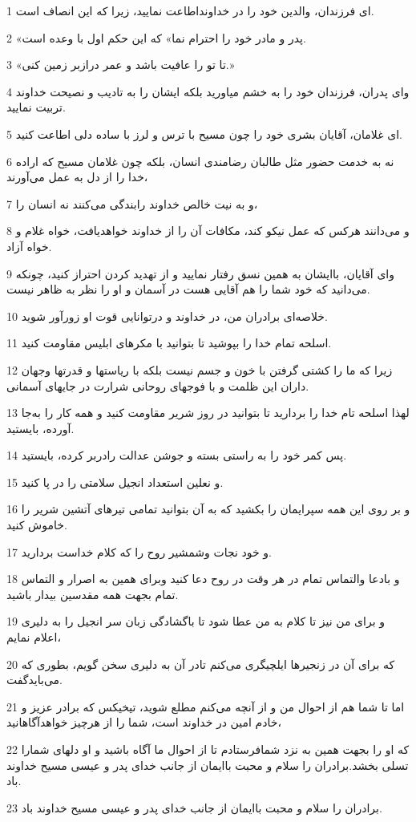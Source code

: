 \par 1 ای فرزندان، والدین خود را در خداونداطاعت نمایید، زیرا که این انصاف است.
\par 2 «پدر و مادر خود را احترام نما» که این حکم اول با وعده است.
\par 3 «تا تو را عافیت باشد و عمر درازبر زمین کنی.»
\par 4 و‌ای پدران، فرزندان خود را به خشم میاورید بلکه ایشان را به تادیب و نصیحت خداوند تربیت نمایید.
\par 5 ‌ای غلامان، آقایان بشری خود را چون مسیح با ترس و لرز با ساده دلی اطاعت کنید.
\par 6 نه به خدمت حضور مثل طالبان رضامندی انسان، بلکه چون غلامان مسیح که اراده خدا را از دل به عمل می‌آورند،
\par 7 و به نیت خالص خداوند رابندگی می‌کنند نه انسان را،
\par 8 و می‌دانند هرکس که عمل نیکو کند، مکافات آن را از خداوند خواهدیافت، خواه غلام و خواه آزاد.
\par 9 و‌ای آقایان، باایشان به همین نسق رفتار نمایید و از تهدید کردن احتراز کنید، چونکه می‌دانید که خود شما را هم آقایی هست در آسمان و او را نظر به ظاهر نیست.
\par 10 خلاصه‌ای برادران من، در خداوند و درتوانایی قوت او زورآور شوید.
\par 11 اسلحه تمام خدا را بپوشید تا بتوانید با مکرهای ابلیس مقاومت کنید.
\par 12 زیرا که ما را کشتی گرفتن با خون و جسم نیست بلکه با ریاستها و قدرتها وجهان داران این ظلمت و با فوجهای روحانی شرارت در جایهای آسمانی.
\par 13 لهذا اسلحه تام خدا را بردارید تا بتوانید در روز شریر مقاومت کنید و همه کار را به‌جا آورده، بایستید.
\par 14 پس کمر خود را به راستی بسته و جوشن عدالت رادربر کرده، بایستید.
\par 15 و نعلین استعداد انجیل سلامتی را در پا کنید.
\par 16 و بر روی این همه سپرایمان را بکشید که به آن بتوانید تمامی تیرهای آتشین شریر را خاموش کنید.
\par 17 و خود نجات وشمشیر روح را که کلام خداست بردارید.
\par 18 و بادعا والتماس تمام در هر وقت در روح دعا کنید وبرای همین به اصرار و التماس تمام بجهت همه مقدسین بیدار باشید.
\par 19 و برای من نیز تا کلام به من عطا شود تا باگشادگی زبان سر انجیل را به دلیری اعلام نمایم،
\par 20 که برای آن در زنجیرها ایلچیگری می‌کنم تادر آن به دلیری سخن گویم، بطوری که می‌بایدگفت.
\par 21 اما تا شما هم از احوال من و از آنچه می‌کنم مطلع شوید، تیخیکس که برادر عزیز و خادم امین در خداوند است، شما را از هرچیز خواهدآگاهانید،
\par 22 که او را بجهت همین به نزد شمافرستادم تا از احوال ما آگاه باشید و او دلهای شمارا تسلی بخشد.برادران را سلام و محبت باایمان از جانب خدای پدر و عیسی مسیح خداوند باد.
\par 23 برادران را سلام و محبت باایمان از جانب خدای پدر و عیسی مسیح خداوند باد.



